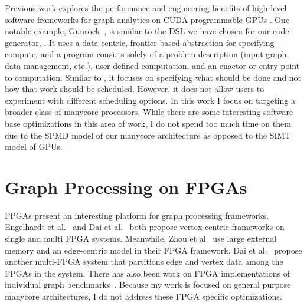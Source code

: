 Previous work explores the performance and engineering benefits of high-level software frameworks for graph analytics on CUDA programmable GPUs \cite{wang2016gunrock, zhong2013medusa, nodehi2018tigr, yang2019graphblast, khorasani2014cusha}. 
One notable example, Gunrock~\cite{wang2016gunrock}, is similar to the DSL we have chosen for our code generator, \graphit. 
It uses a data-centric, frontier-based abstraction for specifying compute, and a program consists solely of a problem description (input graph, data management, etc.), user defined computation, and an enactor or entry point to computation.
Similar to \graphit, it focuses on specifying what should be done and not how that work should be scheduled. 
However, it does not allow users to experiment with different scheduling options.
In this work I focus on targeting a broader class of manycore processors.
While there are some interesting software base optimizations in this area of work, I do not spend too much time on them due to the SPMD model of our manycore architecture as opposed to the SIMT model of GPUs. 

\section{Graph Processing on FPGAs} FPGAs present an interesting platform for graph processing frameworks. Engelhardt et al.~\cite{engelhardt2016gravf} and Dai et al.~\cite{dai2016fpgp} both propose vertex-centric frameworks on single and multi FPGA systems.
Meanwhile, Zhou et al~\cite{zhou2016high} use large external memory and an edge-centric model in their FPGA framework. Dai et al.~\cite{dai2017foregraph} propose another multi-FPGA system that partitions edge and vertex data among the FPGAs in the system.
There has also been work on FPGA implementations of individual graph benchmarks~\cite{zhou2015optimizing, zhou2015accelerating}.
Because my work is focused on general purpose manycore architectures, I do not address these FPGA specific optimizations.

